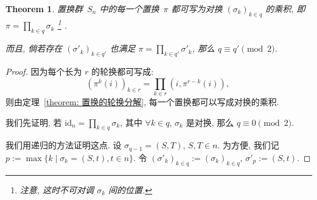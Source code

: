 \documentclass[openany]{ctexbook}
\theoremstyle{plain}
\newtheorem{theorem}{Theorem}[section] %
\theoremstyle{definition}
\newcommand*{\id}{\mathrm{id}} %
\begin{document}
\begin{theorem}\label{theorem: 置换的对换分解}
	置换群~$S_n$ 中的每一个置换~$\pi$ 都可写为对换 $(\sigma_k)_{k \in q}$ 的乘积, 即
	$\pi = \prod_{k \in q} \sigma_k$%
		\footnote{注意, 这时不可对调 $\sigma_k$ 间的位置. }%
		.
	
	而且, 倘若存在 $(\sigma'_k)_{k \in q'}$ 也满足 $\pi = \prod_{k \in q'} \sigma'_k$, 那么 $q \equiv q' \pmod 2$.
\end{theorem}
\begin{proof}
	因为每个长为 $r$ 的轮换都可写成:
	\begin{equation*}
		(\pi^k(i))_{k \in r} = \prod_{k \in r} (i, \pi^{r - k}(i)),\,
	\end{equation*}
	则由定理~\ref{theorem: 置换的轮换分解}, 每一个置换都可以写成对换的乘积.

	我们先证明, 若 $\id_n = \prod_{k \in q} \sigma_k$, 其中 $\forall k \in q$, $\sigma_k$ 是对换, 那么 $q \equiv 0 \pmod 2$.

	我们用递归的方法证明这点. 
	设 $\sigma_{q - 1} = (S, T)$, $S, T \in n$. 
	为方便, 我们记 $p := \max\{ k \mid \sigma_k = (S,t), t\in n\}$.
	令 $(\sigma'_k)_{k \in q} := (\sigma_k)_{k \in q}$, $\sigma'_p := (S, t)$.


\end{proof}
\end{document}

